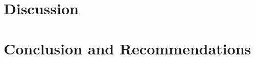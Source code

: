 \section{Discussion}
\label{sec:Discussion}

\section{Conclusion and Recommendations}
\label{sec:Conclusion}

